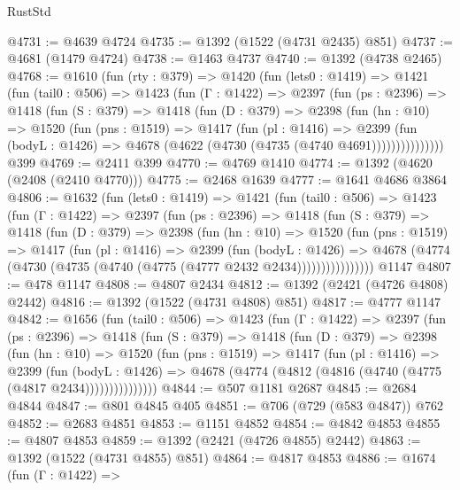 \begin{lexlean}{RustStd}
\begin{coremodule}
@4731 := @4639 @4724
@4735 := @1392 (@1522 (@4731 @2435) @851)
@4737 := @4681 (@1479 @4724)
@4738 := @1463 @4737
@4740 := @1392 (@4738 @2465)
@4768 := @1610
    (fun (rty : @379) =>
    @1420
      (fun (lets0 : @1419) =>
      @1421
        (fun (tail0 : @506) =>
        @1423
          (fun (Γ : @1422) =>
          @2397
            (fun (ps : @2396) =>
            @1418
              (fun (S : @379) =>
              @1418
                (fun (D : @379) =>
                @2398
                  (fun (hn : @10) =>
                  @1520
                    (fun (pns : @1519) =>
                    @1417
                      (fun (pl : @1416) =>
                      @2399
                        (fun (bodyL : @1426) =>
                        @4678 (@4622 (@4730 (@4735 (@4740 @4691)))))))))))))))
    @399
@4769 := @2411 @399
@4770 := @4769 @1410
@4774 := @1392 (@4620 (@2408 (@2410 @4770)))
@4775 := @2468 @1639
@4777 := @1641 @4686 @3864
@4806 := @1632
    (fun (lets0 : @1419) =>
    @1421
      (fun (tail0 : @506) =>
      @1423
        (fun (Γ : @1422) =>
        @2397
          (fun (ps : @2396) =>
          @1418
            (fun (S : @379) =>
            @1418
              (fun (D : @379) =>
              @2398
                (fun (hn : @10) =>
                @1520
                  (fun (pns : @1519) =>
                  @1417
                    (fun (pl : @1416) =>
                    @2399
                      (fun (bodyL : @1426) =>
                      @4678 (@4774 (@4730 (@4735 (@4740 (@4775 (@4777 @2432 @2434))))))))))))))))
    @1147
@4807 := @478 @1147
@4808 := @4807 @2434
@4812 := @1392 (@2421 (@4726 @4808) @2442)
@4816 := @1392 (@1522 (@4731 @4808) @851)
@4817 := @4777 @1147
@4842 := @1656
    (fun (tail0 : @506) =>
    @1423
      (fun (Γ : @1422) =>
      @2397
        (fun (ps : @2396) =>
        @1418
          (fun (S : @379) =>
          @1418
            (fun (D : @379) =>
            @2398
              (fun (hn : @10) =>
              @1520
                (fun (pns : @1519) =>
                @1417
                  (fun (pl : @1416) =>
                  @2399
                    (fun (bodyL : @1426) =>
                    @4678 (@4774 (@4812 (@4816 (@4740 (@4775 (@4817 @2434)))))))))))))))
@4844 := @507 @1181 @2687
@4845 := @2684 @4844
@4847 := @801 @4845 @405
@4851 := @706 (@729 (@583 @4847)) @762
@4852 := @2683 @4851
@4853 := @1151 @4852
@4854 := @4842 @4853
@4855 := @4807 @4853
@4859 := @1392 (@2421 (@4726 @4855) @2442)
@4863 := @1392 (@1522 (@4731 @4855) @851)
@4864 := @4817 @4853
@4886 := @1674
    (fun (Γ : @1422) =>

\end{coremodule}
\end{lexlean}

